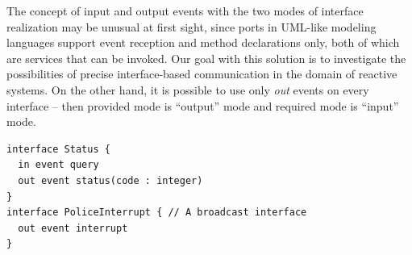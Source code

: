The concept of input and output events with the two modes of interface realization may be unusual at first sight, since ports in UML-like modeling languages support event reception and method declarations only, both of which are services that can be invoked. Our goal with this solution is to investigate the possibilities of precise interface-based communication in the domain of reactive systems. On the other hand, it is possible to use only \emph{out} events on every interface -- then provided mode is ``output'' mode and required
mode is ``input'' mode.

\begin{lstlisting}
interface Status {
  in event query
  out event status(code : integer)
}
interface PoliceInterrupt { // A broadcast interface
  out event interrupt
}
\end{lstlisting}

%

